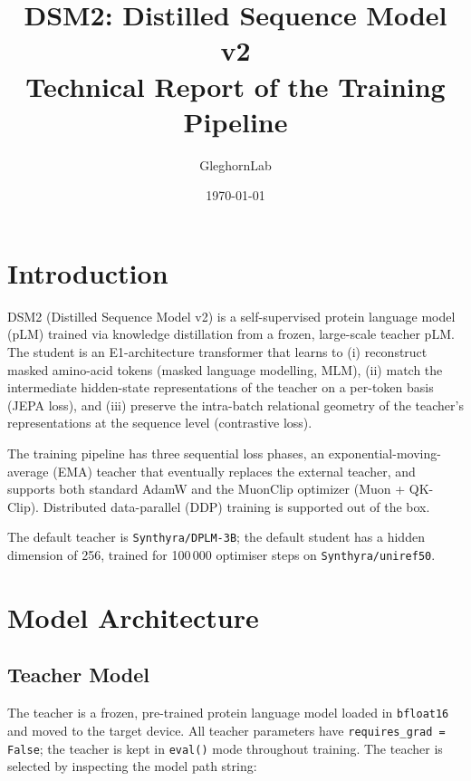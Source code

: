 \documentclass[11pt,a4paper]{article}
\title{\textbf{DSM2: Distilled Sequence Model v2}\\
\large Technical Report of the Training Pipeline}
\author{GleghornLab}
\date{\today}
\begin{document}
\maketitle
\tableofcontents
\newpage

\section{Introduction}

DSM2 (Distilled Sequence Model v2) is a self-supervised protein language model (pLM) trained via
knowledge distillation from a frozen, large-scale teacher pLM.  The student is an E1-architecture
transformer that learns to (i) reconstruct masked amino-acid tokens (masked language modelling,
MLM), (ii) match the intermediate hidden-state representations of the teacher on a per-token basis
(JEPA loss), and (iii) preserve the intra-batch relational geometry of the teacher's representations
at the sequence level (contrastive loss).

The training pipeline has three sequential loss phases, an exponential-moving-average (EMA) teacher
that eventually replaces the external teacher, and supports both standard AdamW and the MuonClip
optimizer (Muon + QK-Clip).  Distributed data-parallel (DDP) training is supported out of the box.

The default teacher is \texttt{Synthyra/DPLM-3B}; the default student has a hidden dimension of
256, trained for 100\,000 optimiser steps on \texttt{Synthyra/uniref50}.

\section{Model Architecture}

\subsection{Teacher Model}

The teacher is a frozen, pre-trained protein language model loaded in \texttt{bfloat16} and moved to
the target device.  All teacher parameters have \texttt{requires\_grad = False}; the teacher is kept
in \texttt{eval()} mode throughout training.  The teacher is selected by inspecting the model path
string:
\end{document}
